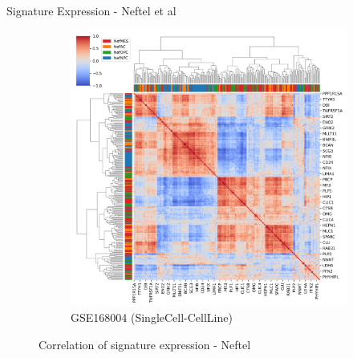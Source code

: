 \documentclass[aspectratio=169,9pt]{beamer}
\begin{document}
\begin{frame}{Signature Expression - Neftel et al}
\begin{adjustwidth}{-5cm}{-5cm}
\begin{figure}
\begin{subfigure}[c]{0.48\textwidth}
                    \includegraphics[width=\textwidth]{mgg23_Corrplot_Nef}
                    \caption{GSE168004 (SingleCell-CellLine)}
                \end{subfigure}
                \caption{Correlation of signature expression - Neftel}
            \end{figure}
        \end{adjustwidth}
    \end{frame}
\end{document}

